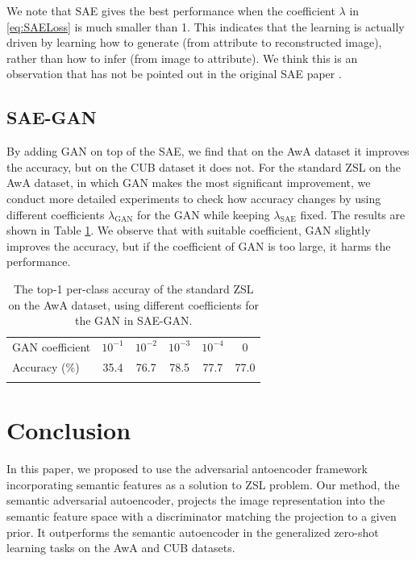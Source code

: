 \documentclass{article}
\begin{document}
We note that SAE gives the best performance when the coefficient $\lambda$ in \eqref{eq:SAELoss} is much smaller than 1. This indicates that the learning is actually driven by learning how to generate (from attribute to reconstructed image), rather than how to infer (from image to attribute). We think this is an observation that has not be pointed out in the original SAE paper \cite{kodirov2017semantic}.


\subsection{SAE-GAN}

By adding GAN on top of the SAE, we find that on the AwA dataset it improves the accuracy, but on the CUB dataset it does not. For the standard ZSL on the AwA dataset, in which GAN makes the most significant improvement, we conduct more detailed experiments to check how accuracy changes by using different coefficients $\lambda_{\textrm{GAN}}$ for the GAN while keeping $\lambda_{\textrm{SAE}}$ fixed. The results are shown in Table \ref{tab:SAEGAN}. We observe that with suitable coefficient, GAN slightly improves the accuracy, but if the coefficient of GAN is too large, it harms the performance.


\begin{table}[t]
\centering
\begin{tabular}{lccccc}
\toprule
GAN coefficient & $10^{-1}$ & $10^{-2}$ & $10^{-3}$ & $10^{-4}$ & 0 \\
Accuracy (\%) & 35.4 & 76.7 & 78.5 & 77.7 & 77.0 \\
\bottomrule \\
\end{tabular}
\caption{The top-1 per-class accuray of the standard ZSL on the AwA dataset, using different coefficients for the GAN in SAE-GAN.}
\label{tab:SAEGAN}
\end{table}



\section{Conclusion}

In this paper, we proposed to use the adversarial antoencoder framework incorporating semantic features as a solution to ZSL problem. Our method, the semantic adversarial autoencoder, projects the image representation into the semantic feature space with a discriminator matching the projection to a given prior. It outperforms the semantic autoencoder in the generalized zero-shot learning tasks on the AwA and CUB datasets.


\newpage



\end{document}
